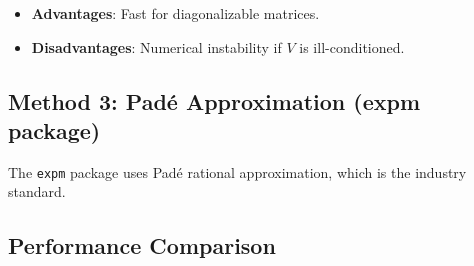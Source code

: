 \documentclass[
]{book}
\providecommand{\tightlist}{%
  \setlength{\itemsep}{0pt}\setlength{\parskip}{0pt}}
\theoremstyle{definition}
\theoremstyle{definition}
\theoremstyle{definition}
\theoremstyle{definition}
\theoremstyle{remark}
\begin{document}
\begin{itemize}
\tightlist
\item
  \textbf{Advantages}: Fast for diagonalizable matrices.
\item
  \textbf{Disadvantages}: Numerical instability if \(V\) is ill-conditioned.
\end{itemize}

\subsection{Method 3: Padé Approximation (expm package)}\label{method-3-paduxe9-approximation-expm-package}

The \texttt{expm} package uses Padé rational approximation, which is the industry standard.

\subsection{Performance Comparison}\label{performance-comparison}
\end{document}
